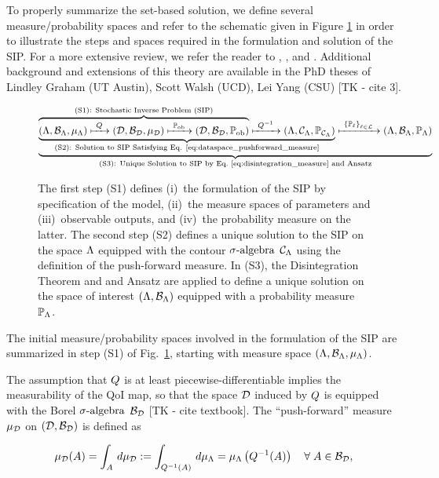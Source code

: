 To properly summarize the set-based solution, we define several measure/probability spaces and refer to the schematic given in Figure \ref{fig:scheme} in order to illustrate the steps and spaces required in the formulation and solution of the SIP.
For a more extensive review, we refer the reader to \cite{BBE11}, \cite{BES12}, and \cite{BET+14}.
Additional background and extensions of this theory are available in the PhD theses of Lindley Graham (UT Austin), Scott Walsh (UCD), Lei Yang (CSU) [TK - cite 3].

\begin{figure}[!h]
\begin{equation}
\underbrace{
\underbrace{
\overbrace{
 ({\Lambda}, \mathcal{B}_{{\Lambda}}, \mu_{{\Lambda}}) \xmapsto{\  Q\ } (\mathcal{D}, \mathcal{B}_{\mathcal{D}}, \mu_{\mathcal{D}})
  \xmapsto{\ \operatorname*{\mathbb{P}_{ob}}\ } (\mathcal{D}, \mathcal{B}_{\mathcal{D}}, \operatorname*{\mathbb{P}_{ob}})
 }^{
 \text{(S1): Stochastic Inverse Problem (SIP)}
 }
 \xmapsto{\ Q^{-1} \ } ({\Lambda}, \mathcal{C}_{{\Lambda}}, \operatorname*{\mathbb{P}_{\mathcal{C}_{{\Lambda}}}})
 }_{
 \text{(S2): Solution to SIP Satisfying Eq. \eqref{eq:dataspace_pushforward_measure}}}
 \xmapsto{\ \left\{\mathbb{P}_\ell\right\}_{\ell\in\mathcal{L}} \ } ({\Lambda}, \mathcal{B}_{{\Lambda}}, \mathbb{P}_{\Lambda})
 }
 _{
 \text{(S3): Unique Solution to SIP by Eq.~\eqref{eq:disintegration_measure} and Ansatz}
 }
\end{equation}
\caption{The first step (S1) defines (i)~the formulation of the SIP by specification of the model, (ii)~the measure spaces of parameters and (iii)~observable outputs, and (iv)~the probability measure on the latter. The second step (S2) defines a unique solution to the SIP on the space ${\Lambda}$ equipped with the contour $\sigma\text{-algebra}$ $\mathcal{C}_{{\Lambda}}$ using the definition of the push-forward measure. In (S3), the Disintegration Theorem and and Ansatz are applied to define a unique solution on the space of interest $({\Lambda}, \mathcal{B}_{{\Lambda}})$ equipped with a probability measure $\mathbb{P}_{\Lambda}$.}
\label{fig:scheme}
\end{figure}


The initial measure/probability spaces involved in the formulation of the SIP are summarized in step (S1) of Fig.~\ref{fig:scheme}, starting with measure space $({\Lambda}, \mathcal{B}_{{\Lambda}}, \mu_{{\Lambda}})$.

The assumption that $Q$ is at least piecewise-differentiable implies the measurability of the QoI map, so that the space $\mathcal{D}$ induced by $Q$ is equipped with the Borel $\sigma\text{-algebra}$ $\mathcal{B}_{\mathcal{D}}$ [TK - cite textbook].
The ``push-forward'' measure $\mu_{\mathcal{D}}$ on ${(\mathcal{D}, \mathcal{B}_{\mathcal{D}})}$ is defined as

\begin{equation}\label{eq:dataspace_pushforward_measure}
\mu_{\mathcal{D}} (A) = \int_A \, d\mu_{\mathcal{D}} := \int_{Q^{-1}(A)} \, d\mu_{{\Lambda}} = \mu_{{\Lambda}} \left (Q^{-1}(A) \right ) \quad \forall \;  A\in\mathcal{B}_{\mathcal{D}},
\end{equation}


